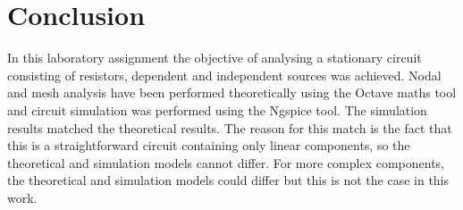 \section{Conclusion}
\label{sec:conclusion}

In this laboratory assignment the objective of analysing a stationary circuit consisting of resistors, dependent and independent sources was achieved. Nodal and mesh analysis have been performed
theoretically using the Octave maths tool and circuit simulation was performed using the Ngspice tool. The simulation results matched the theoretical results. The reason for this match is the fact that this is a
straightforward circuit containing only linear components, so the theoretical
and simulation models cannot differ. For more complex components, the
theoretical and simulation models could differ but this is not the case in this
work.

